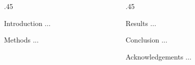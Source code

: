 \begin{columns}[T]
\begin{column}{.45\textwidth}
  \begin{block}{Introduction} ... \end{block}
  \begin{block}{Methods} ... \end{block}
\end{column}
\begin{column}{.45\textwidth}
  \begin{block}{Results} ... \end{block}
  \begin{block}{Conclusion} ... \end{block}
  \begin{block}{Acknowledgements} ... \end{block}
\end{column}
\end{columns}
